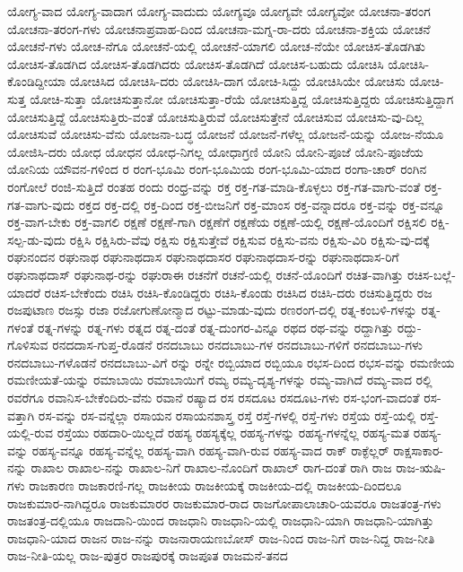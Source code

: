 {ಯೋಗ್ಯ-ವಾದ
ಯೋಗ್ಯ-ವಾದಾಗ
ಯೋಗ್ಯ-ವಾದುದು
ಯೋಗ್ಯವೂ
ಯೋಗ್ಯವೇ
ಯೋಗ್ಯವೋ
ಯೋಚನಾ-ತರಂಗ
ಯೋಚನಾ-ತರಂಗ-ಗಳು
ಯೋಚನಾಪ್ರವಾಹ-ದಿಂದ
ಯೋಚನಾ-ಮಗ್ನ-ರಾ-ದರು
ಯೋಚನಾ-ಶಕ್ತಿಯ
ಯೋಚನೆ
ಯೋಚನೆ-ಗಳು
ಯೋಚ-ನೆಗೂ
ಯೋಚನೆ-ಯಲ್ಲಿ
ಯೋಚನೆ-ಯಾಗಲಿ
ಯೋಚ-ನೆಯೇ
ಯೋಚಿಸ-ತೊಡಗಿತು
ಯೋಚಿಸ-ತೊಡಗಿದ
ಯೋಚಿಸ-ತೊಡಗಿದರು
ಯೋಚಿಸ-ತೊಡಗಿದೆ
ಯೋಚಿಸ-ಬಹುದು
ಯೋಚಿಸಿ
ಯೋಚಿಸಿ-ಕೊಂಡಿದ್ದೀಯಾ
ಯೋಚಿಸಿದ
ಯೋಚಿಸಿ-ದರು
ಯೋಚಿಸಿ-ದಾಗ
ಯೋಚಿ-ಸಿದ್ದು
ಯೋಚಿಸಿಯೇ
ಯೋಚಿಸು
ಯೋಚಿ-ಸುತ್ತ
ಯೋಚಿ-ಸುತ್ತಾ
ಯೋಚಿಸುತ್ತಾನೋ
ಯೋಚಿಸುತ್ತಾ-ರೆಯೆ
ಯೋಚಿಸುತ್ತಿದ್ದ
ಯೋಚಿಸುತ್ತಿದ್ದರು
ಯೋಚಿಸುತ್ತಿದ್ದಾಗ
ಯೋಚಿಸುತ್ತಿದ್ದೆ
ಯೋಚಿಸುತ್ತಿರು-ವಂತೆ
ಯೋಚಿಸುತ್ತಿರುವೆ
ಯೋಚಿಸುತ್ತೇನೆ
ಯೋಚಿಸುವ
ಯೋಚಿಸು-ವು-ದಿಲ್ಲ
ಯೋಚಿಸುವೆ
ಯೋಚಿಸು-ವೆನು
ಯೋಜನಾ-ಬದ್ಧ
ಯೋಜನೆ
ಯೋಜನೆ-ಗಳೆಲ್ಲ
ಯೋಜನೆ-ಯನ್ನು
ಯೋಜ-ನೆಯೂ
ಯೋಜಿಸಿ-ದರು
ಯೋಧ
ಯೋಧನ
ಯೋಧ-ನಿಗಲ್ಲ
ಯೋಧಾಗ್ರಣಿ
ಯೋನಿ
ಯೋನಿ-ಪೂಜೆ
ಯೋನಿ-ಪೂಜೆಯ
ಯೋನಿಯ
ಯೌವನ-ಗಳಿಂದ
ರ
ರಂಗ-ಭೂಮಿ
ರಂಗ-ಭೂಮಿಯ
ರಂಗ-ಭೂಮಿ-ಯಾದ
ರಂಗಾ-ಚಾರ್
ರಂಗಿನ
ರಂಗೋಲೆ
ರಂಜಿ-ಸುತ್ತಿದೆ
ರಂತಹ
ರಂದು
ರಂಧ್ರ-ವನ್ನು
ರಕ್ತ
ರಕ್ತ-ಗತ-ಮಾಡಿ-ಕೊಳ್ಳಲು
ರಕ್ತ-ಗತ-ವಾಗು-ವಂತೆ
ರಕ್ತ-ಗತ-ವಾಗು-ವುದು
ರಕ್ತದ
ರಕ್ತ-ದಲ್ಲಿ
ರಕ್ತ-ದಿಂದ
ರಕ್ತ-ಬೀಜನಿಗೆ
ರಕ್ತ-ಮಾಂಸ
ರಕ್ತ-ವನ್ನಾದರೂ
ರಕ್ತ-ವನ್ನು
ರಕ್ತ-ವನ್ನೂ
ರಕ್ತ-ವಾಗ-ಬೇಕು
ರಕ್ತ-ವಾಗಲಿ
ರಕ್ಷಣೆ
ರಕ್ಷಣೆ-ಗಾಗಿ
ರಕ್ಷಣೆಗೆ
ರಕ್ಷಣೆಯ
ರಕ್ಷಣೆ-ಯಲ್ಲಿ
ರಕ್ಷಣೆ-ಯೊಂದಿಗೆ
ರಕ್ಷಿಸಲಿ
ರಕ್ಷಿ-ಸಲ್ಪ-ಡು-ವುದು
ರಕ್ಷಿಸಿ
ರಕ್ಷಿಸಿರು-ವೆವು
ರಕ್ಷಿಸು
ರಕ್ಷಿಸುತ್ತೇವೆ
ರಕ್ಷಿಸುವ
ರಕ್ಷಿಸು-ವನು
ರಕ್ಷಿಸು-ವಿರಿ
ರಕ್ಷಿಸು-ವು-ದಕ್ಕೆ
ರಘುನಂದನ
ರಘುನಾಥ
ರಘುನಾಥದಾಸ
ರಘುನಾಥದಾಸರ
ರಘುನಾಥದಾಸ-ರನ್ನು
ರಘುನಾಥದಾಸ-ರಿಗೆ
ರಘುನಾಥದಾಸ್
ರಘುನಾಥ-ರನ್ನು
ರಘುರಾಈ
ರಚನೆಗೆ
ರಚನೆ-ಯಲ್ಲಿ
ರಚನೆ-ಯೊಂದಿಗೆ
ರಚಿತ-ವಾಗಿತ್ತು
ರಚಿಸ-ಬಲ್ಲೆ-ಯಾದರೆ
ರಚಿಸ-ಬೇಕೆಂದು
ರಚಿಸಿ
ರಚಿಸಿ-ಕೊಂಡಿದ್ದರು
ರಚಿಸಿ-ಕೊಂಡು
ರಚಿಸಿದ
ರಚಿಸಿ-ದರು
ರಚಿಸುತ್ತಿದ್ದರು
ರಜ
ರಜಪುಟಾಣ
ರಜಸ್ಸು
ರಜಾ
ರಜೋಗುಣೋನ್ಮಾದ
ರಟ್ಟು-ಮಾಡು-ವುದು
ರಣರಂಗ-ದಲ್ಲಿ
ರತ್ನ-ಕಂಬಳಿ-ಗಳನ್ನು
ರತ್ನ-ಗಳಂತೆ
ರತ್ನ-ಗಳನ್ನು
ರತ್ನ-ಗಳು
ರತ್ನದ
ರತ್ನ-ದಂತೆ
ರತ್ನ-ದುಂಗರ-ವಿನ್ನೂ
ರಥದ
ರಥ-ವನ್ನು
ರದ್ದಾಗಿತ್ತು
ರದ್ದು-ಗೊಳಿಸುವ
ರನದದಾಸ-ಗುಪ್ತ-ರೊಡನೆ
ರನದಬಾಬು
ರನದಬಾಬು-ಗಳ
ರನದಬಾಬು-ಗಳಿಗೆ
ರನದಬಾಬು-ಗಳು
ರನದಬಾಬು-ಗಳೊಡನೆ
ರನದಬಾಬು-ವಿಗೆ
ರನ್ನು
ರನ್ನೇ
ರಬ್ಬಿಯಾದ
ರಬ್ಬಿಯೂ
ರಭಸ-ದಿಂದ
ರಭಸ-ವನ್ನು
ರಮಣೀಯ
ರಮಣೀಯತೆ-ಯನ್ನು
ರಮಾಬಾಯಿ
ರಮಾಬಾಯಿಗೆ
ರಮ್ಯ
ರಮ್ಯ-ದೃಶ್ಯ-ಗಳನ್ನು
ರಮ್ಯ-ವಾಗಿದೆ
ರಮ್ಯ-ವಾದ
ರಲ್ಲಿ
ರವರೆಗೂ
ರವಾನಿಸ-ಬೇಕೆಂದಿರು-ವೆನು
ರವಾನೆ
ರಷ್ಯಾದ
ರಸ
ರಸದೂಟ
ರಸದೂಟ-ಗಳು
ರಸ-ಭಂಗ-ವಾದಂತೆ
ರಸ-ವತ್ತಾಗಿ
ರಸ-ವನ್ನು
ರಸ-ವನ್ನೆಲ್ಲಾ
ರಸಾಯನ
ರಸಾಯನಶಾಸ್ತ್ರ
ರಸ್ತೆ
ರಸ್ತೆ-ಗಳಲ್ಲಿ
ರಸ್ತೆ-ಗಳು
ರಸ್ತೆಯ
ರಸ್ತೆ-ಯಲ್ಲಿ
ರಸ್ತೆ-ಯಲ್ಲಿ-ರುವ
ರಸ್ತೆಯು
ರಹದಾರಿ-ಯಿಲ್ಲದೆ
ರಹಸ್ಯ
ರಹಸ್ಯಕ್ಕೆಲ್ಲ
ರಹಸ್ಯ-ಗಳನ್ನು
ರಹಸ್ಯ-ಗಳನ್ನೆಲ್ಲ
ರಹಸ್ಯ-ಮತ
ರಹಸ್ಯ-ವನ್ನು
ರಹಸ್ಯ-ವನ್ನೂ
ರಹಸ್ಯ-ವನ್ನೆಲ್ಲ
ರಹಸ್ಯ-ವಾಗಿ
ರಹಸ್ಯ-ವಾಗಿ-ರುವ
ರಹಸ್ಯ-ವಾದ
ರಾಕ್
ರಾಕ್ಫೆಲ್ಲರ್
ರಾಕ್ಷಸಾಕಾರ-ನನ್ನು
ರಾಖಾಲ
ರಾಖಾಲ-ನನ್ನು
ರಾಖಾಲ-ನಿಗೆ
ರಾಖಾಲ-ನೊಂದಿಗೆ
ರಾಖಾಲ್
ರಾಗ-ದಂತೆ
ರಾಗಿ
ರಾಜ
ರಾಜ-ಋಷಿ-ಗಳು
ರಾಜಕಾರಣ
ರಾಜಕಾರಣಿ-ಗಲ್ಲ
ರಾಜಕೀಯ
ರಾಜಕೀಯಕ್ಕೆ
ರಾಜಕೀಯ-ದಲ್ಲಿ
ರಾಜಕೀಯ-ದಿಂದಲೂ
ರಾಜಕುಮಾರ-ನಾಗಿದ್ದರೂ
ರಾಜಕುಮಾರರ
ರಾಜಕುಮಾರ-ರಾದ
ರಾಜಗೋಪಾಲಾಚಾರಿ-ಯವರೂ
ರಾಜತಂತ್ರ-ಗಳು
ರಾಜತಂತ್ರ-ದಲ್ಲಿಯೂ
ರಾಜದಾನಿ-ಯಿಂದ
ರಾಜಧಾನಿ
ರಾಜಧಾನಿ-ಯಲ್ಲಿ
ರಾಜಧಾನಿ-ಯಾಗಿ
ರಾಜಧಾನಿ-ಯಾಗಿತ್ತು
ರಾಜಧಾನಿ-ಯಾದ
ರಾಜನ
ರಾಜ-ನನ್ನು
ರಾಜನಾರಾಯಣಬೋಸ್
ರಾಜ-ನಿಂದ
ರಾಜ-ನಿಗೆ
ರಾಜ-ನಿದ್ದ
ರಾಜ-ನೀತಿ
ರಾಜ-ನೀತಿ-ಯಲ್ಲ
ರಾಜ-ಪುತ್ರರ
ರಾಜಪುರಕ್ಕೆ
ರಾಜಪೂತ
ರಾಜಮನೆ-ತನದ
}
